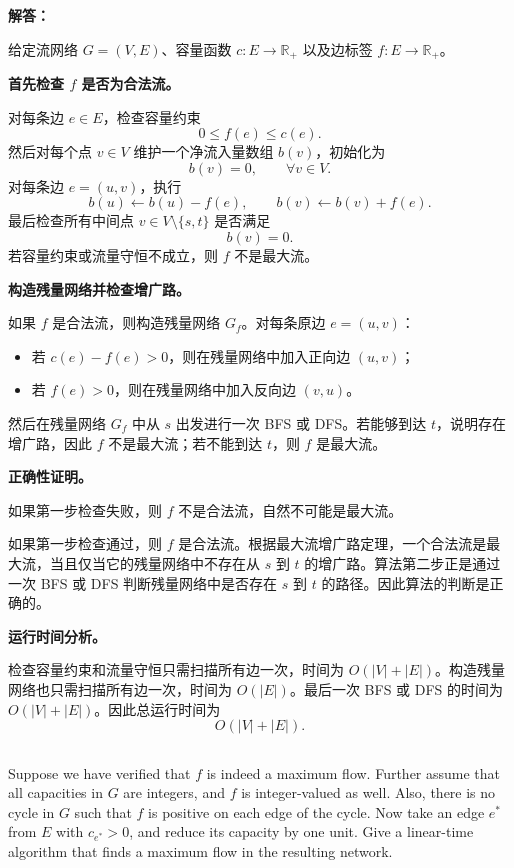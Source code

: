 \documentclass[12pt,a4paper]{article}
\begin{document}
\begin{answerbox}
\textbf{解答：}

给定流网络 $G=(V,E)$、容量函数 $c:E\to \mathbb{R}_+$ 以及边标签 $f:E\to \mathbb{R}_+$。

\textbf{首先检查 $f$ 是否为合法流。}

对每条边 $e\in E$，检查容量约束
\[
  0\le f(e)\le c(e).
\]
然后对每个点 $v\in V$ 维护一个净流入量数组 $b(v)$，初始化为
\[
  b(v)=0,\qquad \forall v\in V.
\]
对每条边 $e=(u,v)$，执行
\[
  b(u)\leftarrow b(u)-f(e),\qquad b(v)\leftarrow b(v)+f(e).
\]
最后检查所有中间点 $v\in V\setminus\{s,t\}$ 是否满足
\[
  b(v)=0.
\]
若容量约束或流量守恒不成立，则 $f$ 不是最大流。

\textbf{构造残量网络并检查增广路。}

如果 $f$ 是合法流，则构造残量网络 $G_f$。对每条原边 $e=(u,v)$：
\begin{itemize}[leftmargin=2em]
  \item 若 $c(e)-f(e)>0$，则在残量网络中加入正向边 $(u,v)$；
  \item 若 $f(e)>0$，则在残量网络中加入反向边 $(v,u)$。
\end{itemize}
然后在残量网络 $G_f$ 中从 $s$ 出发进行一次 BFS 或 DFS。若能够到达 $t$，说明存在增广路，因此 $f$ 不是最大流；若不能到达 $t$，则 $f$ 是最大流。

\textbf{正确性证明。}

如果第一步检查失败，则 $f$ 不是合法流，自然不可能是最大流。

如果第一步检查通过，则 $f$ 是合法流。根据最大流增广路定理，一个合法流是最大流，当且仅当它的残量网络中不存在从 $s$ 到 $t$ 的增广路。算法第二步正是通过一次 BFS 或 DFS 判断残量网络中是否存在 $s$ 到 $t$ 的路径。因此算法的判断是正确的。

\textbf{运行时间分析。}

检查容量约束和流量守恒只需扫描所有边一次，时间为 $O(|V|+|E|)$。构造残量网络也只需扫描所有边一次，时间为 $O(|E|)$。最后一次 BFS 或 DFS 的时间为 $O(|V|+|E|)$。因此总运行时间为
\[
  O(|V|+|E|).
\]

\end{answerbox}

\subsection{}

 Suppose we have verified that $f$ is indeed a maximum flow. Further assume that all capacities in $G$ are integers, and $f$ is integer-valued as well. Also, there is no cycle in $G$ such that $f$ is positive on each edge of the cycle. Now take an edge $e^*$ from $E$ with $c_{e^*}>0$, and reduce its capacity by one unit. Give a linear-time algorithm that finds a maximum flow in the resulting network.
\end{document}
